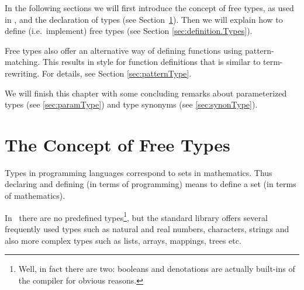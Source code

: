 %
%
%


In the following sections we will first introduce the concept of free
types, as used in \opal, and the declaration of types (see
Section~\ref{sec:freeTypes}).  
Then we will explain how to define (i.e.~implement) free types (see Section
\ref{sec:definition.Types}).

Free types also offer an alternative way of defining functions using
pattern-matching. 
This results in style for function definitions
 that is similar to term-rewriting.
For details, see Section \ref{sec:patternType}.

We will finish this chapter with some concluding remarks about
parameterized types (see \ref{sec:paramType}) and type synonyms (see
\ref{sec:synonType}). 


\section{The Concept of Free Types}
\label{sec:freeTypes}
\advanced
Types in programming languages correspond to sets in mathematics.
Thus declaring and defining (in terms of programming) means to
define a set (in terms of mathematics).

In \opal\ there are no predefined types\footnote{Well, in fact there
  are two: booleans and denotations are actually built-ins of the
  compiler for obvious reasons.}, but the standard library offers
several frequently used types such as natural and real numbers, characters,
strings and also more complex types such as lists, arrays, mappings, trees
etc.

